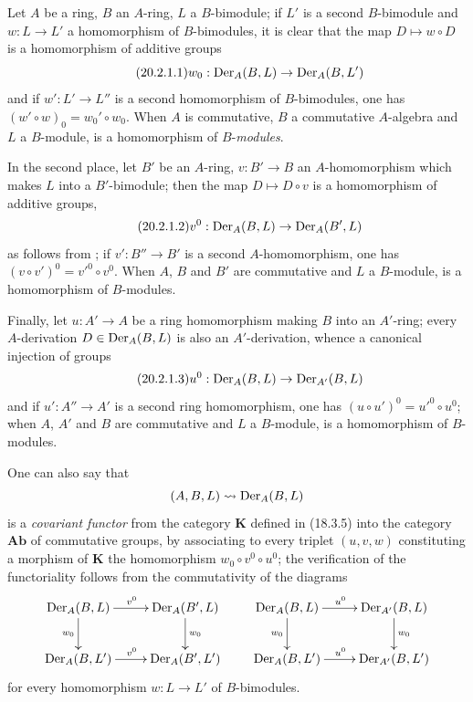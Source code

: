 \begin{env}[20.2.1]
\label{0.20.2.1}
Let $A$ be a ring, $B$ an $A$-ring, $L$ a $B$-bimodule; if $L'$ is a second $B$-bimodule and $w:L\to L'$ a homomorphism of $B$-bimodules, it is clear that the map $D\mapsto w\circ D$ is a homomorphism of additive groups
\begin{equation}
\tag{20.2.1.1}
  \label{0.20.2.1.1}
  w_0:\operatorname{Der}_A(B,L)\to\operatorname{Der}_A(B,L')
\end{equation}
and if $w':L'\to L''$ is a second homomorphism of $B$-bimodules, one has $(w'\circ w)_0=w_0'\circ w_0$.
When $A$ is commutative, $B$ a commutative $A$-algebra and $L$ a $B$-module,  is a homomorphism of $B$-\emph{modules}.

In the second place, let $B'$ be an $A$-ring, $v:B'\to B$ an $A$-homomorphism which makes $L$ into a $B'$-bimodule; then the map $D\mapsto D\circ v$ is a homomorphism of additive groups,
\begin{equation}
\tag{20.2.1.2}
  \label{0.20.2.1.2}
  v^0:\operatorname{Der}_A(B,L)\to\operatorname{Der}_A(B',L)
\end{equation}
as follows from ; if $v':B''\to B'$ is a second $A$-homomorphism, one has $(v\circ v')^0=v'^0\circ v^0$.
When $A$, $B$ and $B'$ are commutative and $L$ a $B$-module,  is a homomorphism of $B$-modules.

Finally, let $u:A'\to A$ be a ring homomorphism making $B$ into an $A'$-ring; every $A$-derivation $D\in\operatorname{Der}_A(B,L)$ is also an $A'$-derivation, whence a canonical injection of groups
\begin{equation}
\tag{20.2.1.3}
  \label{0.20.2.1.3}
  u^0:\operatorname{Der}_A(B,L)\to\operatorname{Der}_{A'}(B,L)
\end{equation}
and if $u':A''\to A'$ is a second ring homomorphism, one has $(u\circ u')^0=u'^0\circ u^0$;
when $A$, $A'$ and $B$ are commutative and $L$ a $B$-module,  is a homomorphism of $B$-modules.

One can also say that
\[
  (A,B,L)\leadsto\operatorname{Der}_A(B,L)
\]
is a \emph{covariant functor} from the category $\boldsymbol{K}$ defined in (18.3.5) into the category $\boldsymbol{Ab}$ of commutative groups, by associating to every triplet $(u,v,w)$ constituting a morphism of $\boldsymbol{K}$ the homomorphism $w_0\circ v^0\circ u^0$; the verification of the functoriality follows from the commutativity of the diagrams
\[
\xymatrix{
  \Der_A(B,L) \ar[r]^{v^0} \ar[d]_{w_0} & \Der_A(B',L) \ar[d]^{w_0} \\
  \Der_A(B,L') \ar[r]^{v^0} & \Der_A(B',L')
}
\qquad
\xymatrix{
  \Der_A(B,L) \ar[r]^{u^0} \ar[d]_{w_0} & \Der_{A'}(B,L) \ar[d]^{w_0} \\
  \Der_A(B,L') \ar[r]^{u^0} & \Der_{A'}(B,L')
}
\]
for every homomorphism $w:L\to L'$ of $B$-bimodules.
\end{env}

